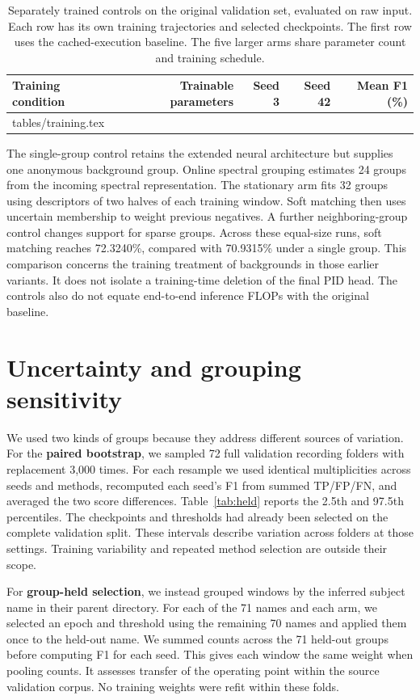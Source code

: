\begin{table}[ht]
\caption{Separately trained controls on the original validation set, evaluated on raw input. Each row has its own training trajectories and selected checkpoints. The first row uses the cached-execution baseline. The five larger arms share parameter count and training schedule.}\label{tab:controls}
\centering\small
\begin{tabular}{@{}lrrrr@{}}
\toprule Training condition & Trainable parameters & Seed 3 & Seed 42 & Mean F1 (\%)\\ \midrule
{} tables/training.tex
\bottomrule
\end{tabular}
\end{table}
The single-group control retains the extended neural architecture but supplies one anonymous background group. Online spectral grouping estimates 24 groups from the incoming spectral representation. The stationary arm fits 32 groups using descriptors of two halves of each training window. Soft matching then uses uncertain membership to weight previous negatives. A further neighboring-group control changes support for sparse groups. Across these equal-size runs, soft matching reaches 72.3240\%, compared with 70.9315\% under a single group. This comparison concerns the training treatment of backgrounds in those earlier variants. It does not isolate a training-time deletion of the final PID head. The controls also do not equate end-to-end inference FLOPs with the original baseline.

\section{Uncertainty and grouping sensitivity}\label{app:robust}
We used two kinds of groups because they address different sources of variation. For the \textbf{paired bootstrap}, we sampled 72 full validation recording folders with replacement 3,000 times. For each resample we used identical multiplicities across seeds and methods, recomputed each seed's F1 from summed TP/FP/FN, and averaged the two score differences. Table~\ref{tab:held} reports the 2.5th and 97.5th percentiles. The checkpoints and thresholds had already been selected on the complete validation split. These intervals describe variation across folders at those settings. Training variability and repeated method selection are outside their scope.

For \textbf{group-held selection}, we instead grouped windows by the inferred subject name in their parent directory. For each of the 71 names and each arm, we selected an epoch and threshold using the remaining 70 names and applied them once to the held-out name. We summed counts across the 71 held-out groups before computing F1 for each seed. This gives each window the same weight when pooling counts. It assesses transfer of the operating point within the source validation corpus. No training weights were refit within these folds.

